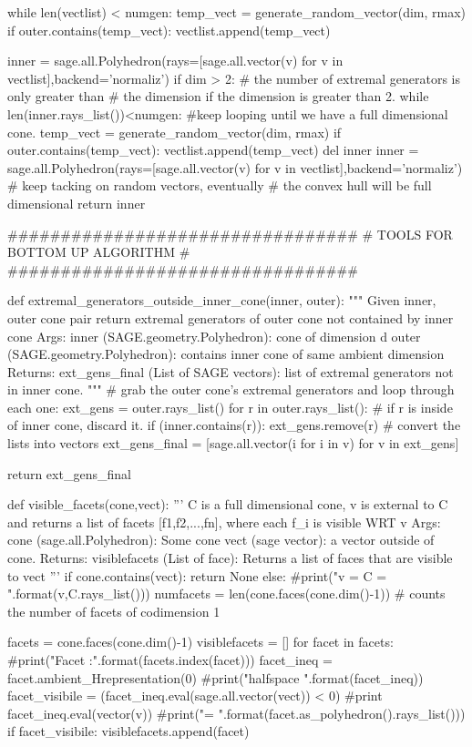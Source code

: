 \documentclass{TC}
\begin{document}
\begin{SAGE}
	while len(vectlist) < numgen:
		temp_vect = generate_random_vector(dim, rmax)
		if outer.contains(temp_vect):
			vectlist.append(temp_vect)

	inner = sage.all.Polyhedron(rays=[sage.all.vector(v) for v in vectlist],backend='normaliz')	
	if dim > 2:	
		# the number of extremal generators is only greater than
		# the dimension if the dimension is greater than 2.
		while len(inner.rays_list())<numgen:
			#keep looping until we have a full dimensional cone. 
			temp_vect = generate_random_vector(dim, rmax)
			if outer.contains(temp_vect):
				vectlist.append(temp_vect)
			del inner
			inner = sage.all.Polyhedron(rays=[sage.all.vector(v) for v in vectlist],backend='normaliz')
			# keep tacking on random vectors, eventually 
			# the convex hull will be full dimensional
	return inner

#################################
# TOOLS FOR BOTTOM UP ALGORITHM #
#################################

def extremal_generators_outside_inner_cone(inner, outer):
	""" Given inner, outer cone pair return extremal generators of outer cone
		not contained by inner cone
	Args:
		inner (SAGE.geometry.Polyhedron): cone of dimension d
		outer (SAGE.geometry.Polyhedron): contains inner cone of same ambient dimension
	Returns:
		ext_gens_final (List of SAGE vectors): list of extremal generators not in inner cone.
	"""
	# grab the outer cone's extremal generators and loop through each one:
	ext_gens = outer.rays_list()
	for r in outer.rays_list():
		# if r is inside of inner cone, discard it.
		if (inner.contains(r)):
			ext_gens.remove(r)
	# convert the lists into vectors			
	ext_gens_final = [sage.all.vector(i for i in v) for v in ext_gens]

	return ext_gens_final 


def visible_facets(cone,vect):
	''' C is a full dimensional cone, v is external to C and returns 
			a list of facets [f1,f2,...,fn], where each f_i is visible WRT v 
		Args:
			cone (sage.all.Polyhedron): Some cone
			vect (sage vector): a vector outside of cone.
		Returns:
			visiblefacets (List of face): Returns a list of faces that are 
				visible to vect
	'''
	if cone.contains(vect):
		return None
	else:
		#print("v = {}\n C = \n{}".format(v,C.rays_list()))
		numfacets = len(cone.faces(cone.dim()-1)) # counts the number of facets of codimension 1

		facets = cone.faces(cone.dim()-1)
		visiblefacets = []
		for facet in facets:
			#print("Facet {}:".format(facets.index(facet)))
			facet_ineq = facet.ambient_Hrepresentation(0)
			#print("\tambient halfspace {}".format(facet_ineq))
			facet_visibile = (facet_ineq.eval(sage.all.vector(vect)) < 0)
			#print facet_ineq.eval(vector(v))
			#print("\trays = {}".format(facet.as_polyhedron().rays_list()))
			if facet_visibile:
				visiblefacets.append(facet)
		

\end{SAGE}
\end{document}
